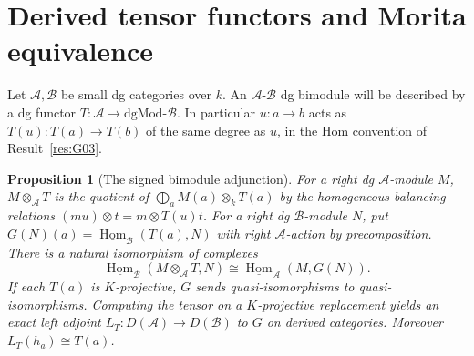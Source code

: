 \documentclass[11pt,oneside,openany]{book}
\newtheorem{proposition}[theorem]{Proposition}
\theoremstyle{definition}
\theoremstyle{remark}
\begin{document}
\section{Derived tensor functors and Morita equivalence}

Let \(\mathcal A,\mathcal B\) be small dg categories over \(k\).
An \(\mathcal A\)-\(\mathcal B\) dg bimodule will be described by a
dg functor \(T:\mathcal A\to \mathrm{dgMod}\text{-}\mathcal B\).
In particular \(u:a\to b\) acts as \(T(u):T(a)\to T(b)\) of the
same degree as \(u\), in the Hom convention of Result~\ref{res:G03}.

\begin{proposition}[The signed bimodule adjunction]\label{res:G13}
For a right dg \(\mathcal A\)-module \(M\), \(M\otimes_\mathcal A T\)
is the quotient of \(\bigoplus_a M(a)\otimes_k T(a)\) by the
homogeneous balancing relations
\((m u)\otimes t=m\otimes T(u)t\).
For a right dg \(\mathcal B\)-module \(N\), put
\(G(N)(a)=\underline{\operatorname{Hom}}_\mathcal B(T(a),N)\)
with right \(\mathcal A\)-action by precomposition. There is a
natural isomorphism of complexes
\[
 \underline{\operatorname{Hom}}_\mathcal B(M\otimes_\mathcal A T,N)
    \cong \underline{\operatorname{Hom}}_\mathcal A(M,G(N)).
\]
If each \(T(a)\) is \(K\)-projective, \(G\) sends quasi-isomorphisms
to quasi-isomorphisms. Computing the tensor on a \(K\)-projective
replacement yields an exact left adjoint
\(L_T:D(\mathcal A)\to D(\mathcal B)\) to \(G\) on derived categories.
Moreover \(L_T(h_a)\cong T(a)\).
\end{proposition}
\end{document}
